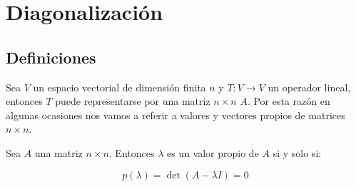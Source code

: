 
\section{Diagonalización}

	\subsection{Definiciones}

		\begin{definicion}
			Sea $V$ un espacio vectorial de dimensión finita $n$ y $T \colon V \to V$ un operador lineal, entonces $T$ puede representarse por una matriz $n \times n$ $A$.
			Por esta razón en algunas ocasiones nos vamos a referir a valores y vectores propios de matrices $n \times n$.
		\end{definicion}

		\begin{teorema}
			Sea $A$ una matriz $n \times n$. Entonces $\lambda$ es un valor propio de $A$ si y solo si:

			\begin{equation}
				p(\lambda) = \det{(A - \lambda I)} = 0
			\end{equation}
		\end{teorema}

